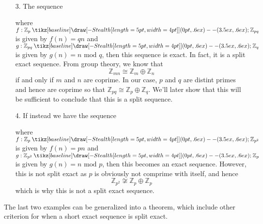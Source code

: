 \documentclass[12pt,letterpaper]{algebra_book}
\newcommand{\smallish}{1.45em} %
\renewcommand{\to}{\mathbin{\tikz[baseline] \draw[-{Stealth[length=5pt,width=4pt]}] (0pt,.6ex) -- (3.5ex,.6ex);}}
\newcommand{\ZZ}{\mathbb{Z}}
\theoremstyle{definition}
\begin{document}
\begin{itemize}
    \item[3.] The sequence
    \begin{center} 
    \end{center}
    where $f:\ZZ_p \to \ZZ_{pq}$ is given by $f(n) = qn$ and
    $g: \ZZ_{pq} \to \ZZ_q$ is given by $g(n) = n \mbox{ mod } q$,
    then this sequence is exact. In fact, it is a split exact sequence.
    From group theory, we know that 
    \[
        \ZZ_{mn} \cong \ZZ_m \oplus \ZZ_n
    \]
    if and only if $m$ and $n$ are coprime. In our case, $p$ and
    $q$ are distint primes and hence are coprime so that $\ZZ_{pq} \cong \ZZ_p \oplus \ZZ_q$. We'll later show
    that this will be sufficient to conclude that this is a split
    sequence.

    \item[4.] If instead we have the sequence
    \begin{center} 
    \end{center}
    where $f:\ZZ_p \to \ZZ_{p^2}$ is given by $f(n) = pn$ and
    $g: \ZZ_{p^2} \to \ZZ_p$ is given by $g(n) = n \mbox{ mod }p$,
    then this becomes
    an exact sequence. However, this is not split exact as
    $p$ is obviously not comprime with itself, and hence 
    \[
        \ZZ_{p^2} \not\cong \ZZ_p \oplus \ZZ_p
    \]
    which is why this is not a split exact sequence. 
\end{itemize}

The last two examples can be generalized into a theorem, which
include other criterion for when a short exact sequence is split
exact. 
\end{document}
